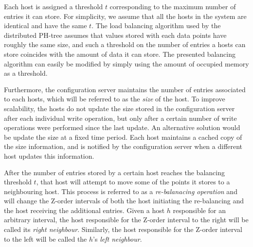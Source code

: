 \documentclass[11pt,a4paper]{globis-book}
\begin{document}
Each host is assigned a threshold $t$ corresponding to the maximum number of entries it can store. For simplicity, we assume that all the hosts in the system are identical and have the same $t$. The load balancing algorithm used by the distributed PH-tree assumes that values stored with each data points have roughly the same size, and such a threshold on the number of entries a hosts can store coincides with the amount of data it can store. The presented balancing algorithm can easily be modified by simply using the amount of occupied memory as a threshold. 

Furthermore, the configuration server maintains the number of entries associated to each hosts, which will be referred to as the \textit{size} of the host. To improve scalability, the hosts do not update the size stored in the configuration server after each individual write operation, but only after a certain number of write operations were performed since the last update. An alternative solution would be update the size at a fixed time period. Each host maintains a cached copy of the size information, and is notified by the configuration server when a different host updates this information.

After the number of entries stored by a certain host reaches the balancing threshold $t$, that host will attempt to move some of the points it stores to a neighbouring host. This process is referred to as a \textit{re-balanacing operation} and will change the Z-order intervals of both the host initiating the re-balancing and the host receiving the additional entries.
Given a host $h$ responsible for an arbitrary interval, the host responsible for the Z-order interval to the right will be called its \textit{right neighbour}. Similarly, the host responsible for the Z-order interval to the left will be called the $h$'s \textit{left neighbour}. 
\end{document}
